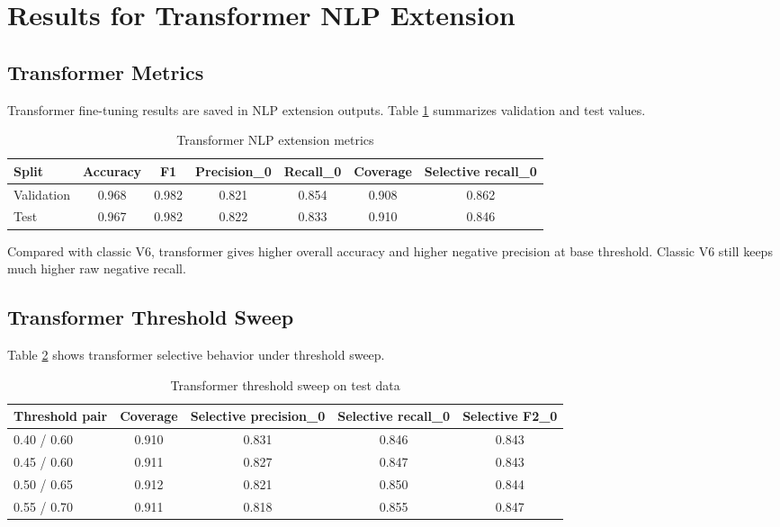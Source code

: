 \documentclass[12pt,a4paper]{article}
\begin{document}
\section{Results for Transformer NLP Extension}
\subsection{Transformer Metrics}
Transformer fine-tuning results are saved in NLP extension outputs. Table \ref{tab:nlp_transformer_metrics} summarizes validation and test values.

\begin{table}[H]
\centering
\caption{Transformer NLP extension metrics}
\label{tab:nlp_transformer_metrics}
\begin{tabular}{lcccccc}
\toprule
Split & Accuracy & F1 & Precision\_0 & Recall\_0 & Coverage & Selective recall\_0 \\
\midrule
Validation & 0.968 & 0.982 & 0.821 & 0.854 & 0.908 & 0.862 \\
Test & 0.967 & 0.982 & 0.822 & 0.833 & 0.910 & 0.846 \\
\bottomrule
\end{tabular}
\end{table}

Compared with classic V6, transformer gives higher overall accuracy and higher negative precision at base threshold. Classic V6 still keeps much higher raw negative recall.

\subsection{Transformer Threshold Sweep}
Table \ref{tab:nlp_transformer_threshold} shows transformer selective behavior under threshold sweep.

\begin{table}[H]
\centering
\caption{Transformer threshold sweep on test data}
\label{tab:nlp_transformer_threshold}
\begin{tabular}{lcccc}
\toprule
Threshold pair & Coverage & Selective precision\_0 & Selective recall\_0 & Selective F2\_0 \\
\midrule
0.40 / 0.60 & 0.910 & 0.831 & 0.846 & 0.843 \\
0.45 / 0.60 & 0.911 & 0.827 & 0.847 & 0.843 \\
0.50 / 0.65 & 0.912 & 0.821 & 0.850 & 0.844 \\
0.55 / 0.70 & 0.911 & 0.818 & 0.855 & 0.847 \\
\bottomrule
\end{tabular}
\end{table}
\end{document}
